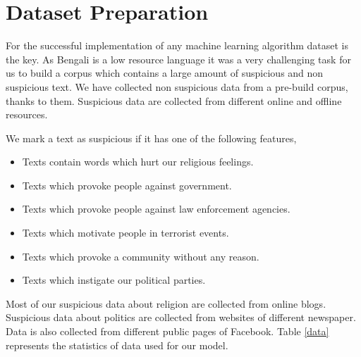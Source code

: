 \section{\textbf{Dataset Preparation}}
For the successful implementation of any machine learning algorithm dataset is the key. As Bengali is a low resource language it was a very challenging task for us to build a corpus which contains a large amount of suspicious and non suspicious text. We have collected non suspicious data from a pre-build corpus\cite{banglacorpus}, thanks to them. Suspicious data are collected from different online and offline resources.%
\par \vspace{0.3cm} 
We mark a text as suspicious if it has one of the following features,
\begin{itemize}
    \item Texts contain words which hurt our religious feelings.\vspace{0.2cm} 
    \item Texts which provoke people against government.\vspace{0.2cm} 
    \item Texts which provoke people against law enforcement agencies.\vspace{0.2cm} 
    \item Texts which motivate people in terrorist events.\vspace{0.2cm} 
    \item Texts which provoke a community without any reason.\vspace{0.2cm} 
    \item Texts which instigate our political parties. 
\end{itemize}
 \par \vspace{0.3cm}
 Most of our suspicious data about religion are collected from online blogs\cite{nastikya, dhormo, istishon}. Suspicious data about politics are collected from websites of different newspaper\cite{palo, kk, juga}. Data is also collected from different public pages of Facebook\cite{bash}. Table \ref{data} represents the statistics of data used for our model.
 
